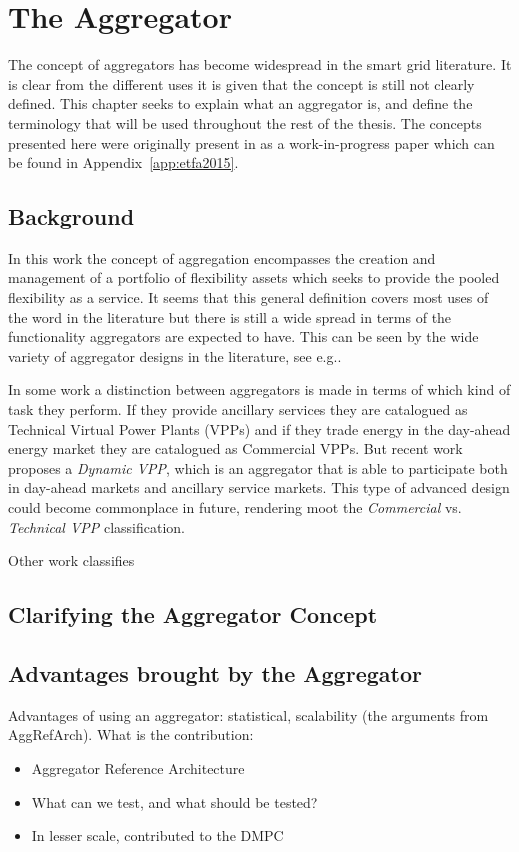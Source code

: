 \chapter{The Aggregator} %
\label{cha:aggregator}
The concept of aggregators has become widespread in the smart grid literature. It is clear from the different uses it is given that the concept is still not clearly defined. This chapter seeks to explain what an aggregator is, and define the terminology that will be used throughout the rest of the thesis. The concepts presented here were originally present in as a work-in-progress paper which can be found in Appendix~\ref{app:etfa2015}. 

\section{Background}
In this work the concept of aggregation encompasses the creation and management of a portfolio of flexibility assets which seeks to provide the pooled flexibility as a service. It seems that this general definition covers most uses of the word in the literature but there is still a wide spread in terms of the functionality aggregators are expected to have. This can be seen by the wide variety of aggregator designs in the literature, see e.g.\cite{kok2005powermatcher,han2010development,sortomme2011optimal,costanzo2013coordination}.

In some work a distinction between aggregators is made in terms of which kind of task they perform. If they provide ancillary services they are catalogued as Technical Virtual Power Plants (VPPs) and if they trade energy in the day-ahead energy market they are catalogued as Commercial VPPs. But recent work proposes a \emph{Dynamic VPP}, which is an aggregator that is able to participate both in day-ahead markets and ancillary service markets. This type of advanced design could become commonplace in future, rendering moot the \emph{Commercial} vs. \emph{Technical VPP} classification. 

Other work classifies 


\section{Clarifying the Aggregator Concept}

\section{Advantages brought by the Aggregator}
Advantages of using an aggregator: statistical, scalability (the arguments from AggRefArch). What is the contribution:
\begin{itemize}
	\item Aggregator Reference Architecture
	\item What can we test, and what should be tested?
	\item In lesser scale, contributed to the DMPC
\end{itemize}

